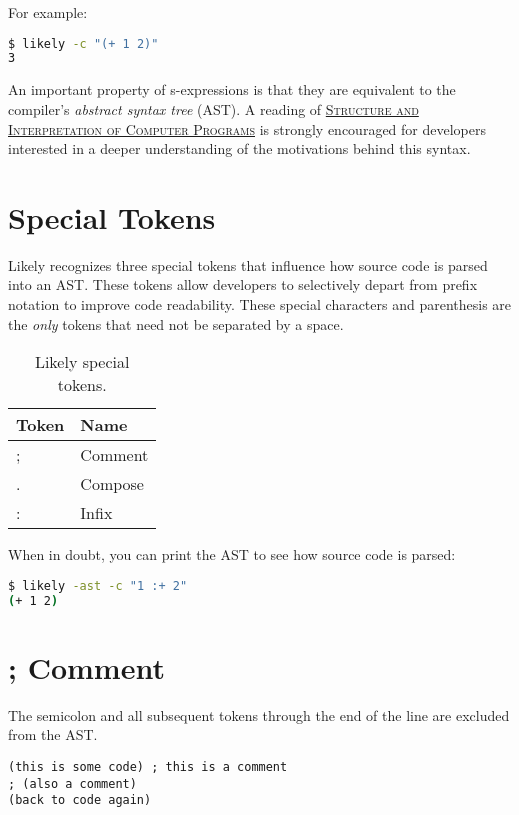 \documentclass[twoside=false, numbers=noenddot]{scrbook}
\newcommand{\noun}[1]{\textsc{#1}}
\newcommand{\cref}[3]{\href{#1}{\noun{#2}}\cite{#3}}
\begin{document}
For example:

\begin{lstlisting}[language=bash, caption={Prefix notation example.}, captionpos=b]
$ likely -c "(+ 1 2)"
3
\end{lstlisting}

An important property of s-expressions is that they are equivalent to the compiler's \emph{abstract syntax tree} (AST).
A reading of \cref{https://mitpress.mit.edu/sicp/full-text/book/book.html}{Structure and Interpretation of Computer Programs}{Abelson:1996:SIC:547755} is strongly encouraged for developers interested in a deeper understanding of the motivations behind this syntax.

\section{Special Tokens}
Likely recognizes three special tokens that influence how source code is parsed into an AST.
These tokens allow developers to selectively depart from prefix notation to improve code readability.
These special characters and parenthesis are the \emph{only} tokens that need not be separated by a space.

\begin{table}[h]
\centering
\begin{tabular}{@{} l l @{}}
\toprule
Token & Name    \\ \midrule
;     & Comment \\
.     & Compose \\
:     & Infix   \\
\bottomrule
\end{tabular}
\caption{Likely special tokens.}
\end{table}

When in doubt, you can print the AST to see how source code is parsed:
\begin{lstlisting}[language=bash, caption={Printing the abstract syntax tree.}, captionpos=b]
$ likely -ast -c "1 :+ 2"
(+ 1 2)
\end{lstlisting}

\section{; Comment}
The semicolon and all subsequent tokens through the end of the line are excluded from the AST.

\begin{verbatim}
(this is some code) ; this is a comment
; (also a comment)
(back to code again)
\end{verbatim}
\end{document}
